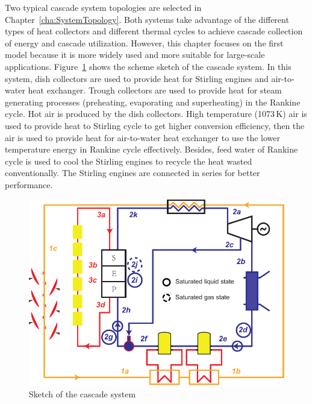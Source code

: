 Two typical cascade system topologies are selected in Chapter~\ref{cha:SystemTopology}. 
Both systems take advantage of the different types of heat collectors and different thermal cycles to achieve cascade collection of energy and cascade utilization.
However, this chapter focuses on the first model because it is more widely used and more suitable for large-scale applications. 
Figure~\ref{fig:System-1} shows the scheme sketch of the cascade system.
In this system, dish collectors are used to provide heat for Stirling engines and air-to-water heat exchanger. Trough collectors are used to provide heat for steam generating processes (preheating, evaporating and superheating) in the Rankine cycle. Hot air is produced by the dish collectors. High temperature (1073\,K) air is used to provide heat to Stirling cycle to get higher conversion efficiency, then the air is used to provide heat for air-to-water heat exchanger to use the lower temperature energy in Rankine cycle effectively. Besides, feed water of Rankine cycle is used to cool the Stirling engines to recycle the heat wasted conventionally. The Stirling engines are connected in series for better performance.

\noindent \begin{figure}[htbp]
\begin{center}
	\includegraphics[width = 0.8\columnwidth]{fig/cascadeSystem}
	\caption{Sketch of the cascade system}
	\label{fig:System-1}
\end{center}
\end{figure}

